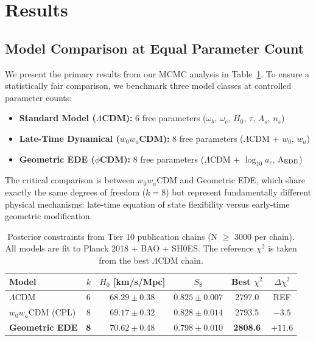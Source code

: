 
\section{Results}

\subsection{Model Comparison at Equal Parameter Count}

We present the primary results from our MCMC analysis in Table~\ref{tab:main_results}. To ensure a statistically fair comparison, we benchmark three model classes at controlled parameter counts:

\begin{itemize}
    \item \textbf{Standard Model ($\Lambda$CDM):} 6 free parameters ($\omega_b$, $\omega_c$, $H_0$, $\tau$, $A_s$, $n_s$)
    \item \textbf{Late-Time Dynamical ($w_0w_a$CDM):} 8 free parameters ($\Lambda$CDM + $w_0$, $w_a$)
    \item \textbf{Geometric EDE ($\phi$CDM):} 8 free parameters ($\Lambda$CDM + $\log_{10}a_c$, $\Lambda_{\rm EDE}$)
\end{itemize}

The critical comparison is between $w_0w_a$CDM and Geometric EDE, which share exactly the same degrees of freedom ($k=8$) but represent fundamentally different physical mechanisms: late-time equation of state flexibility versus early-time geometric modification.

\begin{table}[h]
\centering
\caption{Posterior constraints from Tier 10 publication chains (N $\geq$ 3000 per chain). All models are fit to Planck 2018 + BAO + SH0ES. The reference $\chi^2$ is taken from the best $\Lambda$CDM chain.}
\label{tab:main_results}
\begin{tabular}{lccccc}
\hline\hline
Model & $k$ & $H_0$ [km/s/Mpc] & $S_8$ & Best $\chi^2$ & $\Delta\chi^2$ \\
\hline
$\Lambda$CDM & 6 & $68.29 \pm 0.38$ & $0.825 \pm 0.007$ & 2797.0 & REF \\
$w_0w_a$CDM (CPL) & 8 & $69.17 \pm 0.32$ & $0.828 \pm 0.014$ & 2793.5 & $-3.5$ \\
\textbf{Geometric EDE} & \textbf{8} & $\mathbf{70.62 \pm 0.48}$ & $\mathbf{0.798 \pm 0.010}$ & \textbf{2808.6} & $+11.6$ \\
\hline\hline
\end{tabular}
\end{table}

